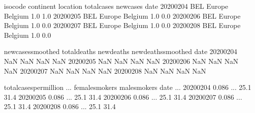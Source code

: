 \documentclass[letterpaper,10pt,english]{jupyterBook}
\begin{document}
\begin{sphinxVerbatim}[commandchars=\\\{\}]
  \PYG{p}{[}\PYG{p}{]}
\end{sphinxVerbatim}

\begin{sphinxVerbatim}[commandchars=\\\{\}]
           iso\PYGZus{}code continent location  total\PYGZus{}cases  new\PYGZus{}cases  \PYGZbs{}
date                                                             
2020\PYGZhy{}02\PYGZhy{}04      BEL    Europe  Belgium          1.0        1.0   
2020\PYGZhy{}02\PYGZhy{}05      BEL    Europe  Belgium          1.0        0.0   
2020\PYGZhy{}02\PYGZhy{}06      BEL    Europe  Belgium          1.0        0.0   
2020\PYGZhy{}02\PYGZhy{}07      BEL    Europe  Belgium          1.0        0.0   
2020\PYGZhy{}02\PYGZhy{}08      BEL    Europe  Belgium          1.0        0.0   

            new\PYGZus{}cases\PYGZus{}smoothed  total\PYGZus{}deaths  new\PYGZus{}deaths  new\PYGZus{}deaths\PYGZus{}smoothed  \PYGZbs{}
date                                                                            
2020\PYGZhy{}02\PYGZhy{}04                 NaN           NaN         NaN                  NaN   
2020\PYGZhy{}02\PYGZhy{}05                 NaN           NaN         NaN                  NaN   
2020\PYGZhy{}02\PYGZhy{}06                 NaN           NaN         NaN                  NaN   
2020\PYGZhy{}02\PYGZhy{}07                 NaN           NaN         NaN                  NaN   
2020\PYGZhy{}02\PYGZhy{}08                 NaN           NaN         NaN                  NaN   

            total\PYGZus{}cases\PYGZus{}per\PYGZus{}million  ...  female\PYGZus{}smokers  male\PYGZus{}smokers  \PYGZbs{}
date                                 ...                                 
2020\PYGZhy{}02\PYGZhy{}04                    0.086  ...            25.1          31.4   
2020\PYGZhy{}02\PYGZhy{}05                    0.086  ...            25.1          31.4   
2020\PYGZhy{}02\PYGZhy{}06                    0.086  ...            25.1          31.4   
2020\PYGZhy{}02\PYGZhy{}07                    0.086  ...            25.1          31.4   
2020\PYGZhy{}02\PYGZhy{}08                    0.086  ...            25.1          31.4   


\end{sphinxVerbatim}
\end{document}
